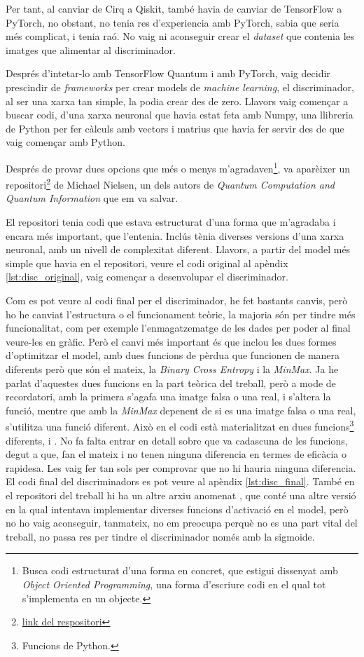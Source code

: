 Per tant, al canviar de Cirq a Qiskit, també havia de canviar de TensorFlow a PyTorch, no obstant, no tenia res d'experiencia amb PyTorch, sabia que seria més complicat, i tenia raó. No vaig ni aconseguir crear el \textit{dataset} que contenia les imatges que alimentar al discriminador. 

Després d'intetar-lo amb TensorFlow Quantum i amb PyTorch, vaig decidir prescindir de \textit{frameworks} per crear models de \textit{machine learning}, el discriminador, al ser una xarxa tan simple, la podia crear des de zero. Llavors vaig començar a buscar codi, d'una xarxa neuronal que havia estat feta amb Numpy, una llibreria de Python per fer càlculs amb vectors i matrius que havia fer servir des de que vaig començar amb Python.

Després de provar dues opcions que més o menys m'agradaven\footnote{Busca codi estructurat d'una forma en concret, que estigui dissenyat amb \textit{Object Oriented Programming}, una forma d'escriure codi en el qual tot s'implementa en un objecte.}, va aparèixer un repositori\footnote{\href{https://github.com/mnielsen/neural-networks-and-deep-learning}{link del respositori}} de Michael Nielsen, un dels autors de \textit{Quantum Computation and Quantum Information} \cite{QCandQI} que em va salvar. 

El repositori tenia codi que estava estructurat d'una forma que m'agradaba i encara més important, que l'entenia. Inclús tènia diverses versions d'una xarxa neuronal, amb un nivell de complexitat diferent. Llavors, a partir del model més simple que havia en el repositori, veure el codi original al apèndix \ref{lst:disc_original}, vaig començar a desenvolupar el discriminador. 

Com es pot veure al codi final per el discriminador, he fet bastants canvis, però ho he canviat l'estructura o el funcionament teòric, la majoria són per tindre més funcionalitat, com per exemple l'enmagatzematge de les dades per poder al final veure-les en gràfic. Però el canvi més important és que inclou les dues formes d'optimitzar el model, amb dues funcions de pèrdua que funcionen de manera diferents però que són el mateix, la \textit{Binary Cross Entropy} i la \textit{MinMax}. Ja he parlat d'aquestes dues funcions en la part teòrica del treball, però a mode de recordatori, amb la primera s'agafa una imatge falsa o una real, i s'altera la funció, mentre que amb la \textit{MinMax} depenent de si es una imatge falsa o una real, s'utilitza una funció diferent. Això en el codi està materialitzat en dues funcions\footnote{Funcions de Python.} diferents,  i . No fa falta entrar en detall sobre que va cadascuna de les funcions, degut a que, fan el mateix i no tenen ninguna diferencia en termes de eficàcia o rapidesa. Les vaig fer tan sols per comprovar que no hi hauria ninguna diferencia. El codi final del discriminadors es pot veure al apèndix \ref{lst:disc_final}. També en el repositori del treball hi ha un altre arxiu anomenat , que conté una altre versió en la qual intentava implementar diverses funcions d'activació en el model, però no ho vaig aconseguir, tanmateix, no em preocupa perquè no es una part vital del treball, no passa res per tindre el discriminador només amb la sigmoide. 

